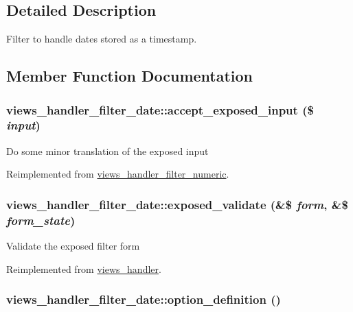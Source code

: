 \subsection{Detailed Description}
Filter to handle dates stored as a timestamp. 

\subsection{Member Function Documentation}
\hypertarget{classviews__handler__filter__date_063da758bf1832f38454620cbc94e304}{
\subsubsection[{accept\_\-exposed\_\-input}]{\setlength{\rightskip}{0pt plus 5cm}views\_\-handler\_\-filter\_\-date::accept\_\-exposed\_\-input (\$ {\em input})}}
\label{classviews__handler__filter__date_063da758bf1832f38454620cbc94e304}


Do some minor translation of the exposed input 

Reimplemented from \hyperlink{classviews__handler__filter__numeric_0fd6abb3062be32410bef3c1cefdaaf5}{views\_\-handler\_\-filter\_\-numeric}.\hypertarget{classviews__handler__filter__date_0146f5fd6dee328506fc6f29006eb401}{
\subsubsection[{exposed\_\-validate}]{\setlength{\rightskip}{0pt plus 5cm}views\_\-handler\_\-filter\_\-date::exposed\_\-validate (\&\$ {\em form}, \/  \&\$ {\em form\_\-state})}}
\label{classviews__handler__filter__date_0146f5fd6dee328506fc6f29006eb401}


Validate the exposed filter form 

Reimplemented from \hyperlink{classviews__handler_2dd536754e4764cc82ffe7c864f54b16}{views\_\-handler}.\hypertarget{classviews__handler__filter__date_5fdeb678009a8c8c23395826caee3062}{
\subsubsection[{option\_\-definition}]{\setlength{\rightskip}{0pt plus 5cm}views\_\-handler\_\-filter\_\-date::option\_\-definition ()}}
\label{classviews__handler__filter__date_5fdeb678009a8c8c23395826caee3062}


